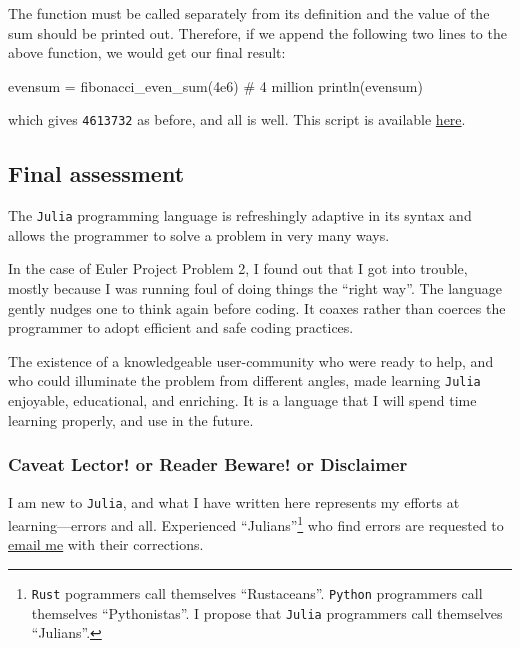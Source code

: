 \documentclass[
  a4paper,
]{article}
\newenvironment{Shaded}{\begin{snugshade}}{\end{snugshade}}
\newcommand{\CommentTok}[1]{\textcolor[rgb]{0.50,0.62,0.50}{#1}}
\newcommand{\FloatTok}[1]{\textcolor[rgb]{0.75,0.75,0.82}{#1}}
\newcommand{\FunctionTok}[1]{\textcolor[rgb]{0.94,0.94,0.56}{#1}}
\newcommand{\NormalTok}[1]{\textcolor[rgb]{0.80,0.80,0.80}{#1}}
\newcommand{\OperatorTok}[1]{\textcolor[rgb]{0.94,0.94,0.82}{#1}}
\begin{document}
The function must be called separately from its definition and the value
of the sum should be printed out. Therefore, if we append the following
two lines to the above function, we would get our final result:

\begin{Shaded}
\begin{Highlighting}[]
\NormalTok{evensum }\OperatorTok{=} \FunctionTok{fibonacci\_even\_sum}\NormalTok{(}\FloatTok{4e6}\NormalTok{) }\CommentTok{\# 4 million}
\FunctionTok{println}\NormalTok{(evensum)}
\end{Highlighting}
\end{Shaded}

which gives \texttt{4613732} as before, and all is well. This script is
available \href{auxiliary/direct-even-sum.jl}{here}.

\hypertarget{final-assessment}{%
\subsection{Final assessment}\label{final-assessment}}

The \texttt{Julia} programming language is refreshingly adaptive in its
syntax and allows the programmer to solve a problem in very many ways.

In the case of Euler Project Problem 2, I found out that I got into
trouble, mostly because I was running foul of doing things the ``right
way''. The language gently nudges one to think again before coding. It
coaxes rather than coerces the programmer to adopt efficient and safe
coding practices.

The existence of a knowledgeable user-community who were ready to help,
and who could illuminate the problem from different angles, made
learning \texttt{Julia} enjoyable, educational, and enriching. It is a
language that I will spend time learning properly, and use in the
future.

\hypertarget{caveat-lector-or-reader-beware-or-disclaimer}{%
\subsubsection{Caveat Lector! or Reader Beware! or
Disclaimer}\label{caveat-lector-or-reader-beware-or-disclaimer}}

I am new to \texttt{Julia}, and what I have written here represents my
efforts at learning---errors and all. Experienced ``Julians''\footnote{\texttt{Rust}
  pogrammers call themselves ``Rustaceans''. \texttt{Python} programmers
  call themselves ``Pythonistas''. I propose that \texttt{Julia}
  programmers call themselves ``Julians''.} who find errors are
requested to \href{mailto:feedback.swanlotus@gmail.com}{email me} with
their corrections.  \normalfont
\end{document}
